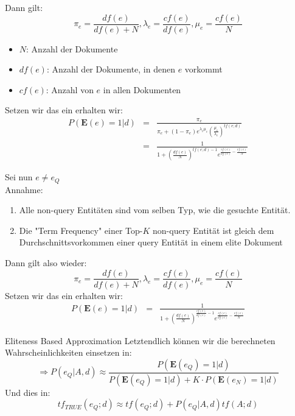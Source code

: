 \documentclass{beamer}
\begin{document}
\begin{frame}
Dann gilt:
\[ \pi_e = \frac{df(e)}{df(e)+N}, \lambda_e = \frac{cf(e)}{df(e)}, \mu_e = \frac{cf(e)}{N}\]
\begin{itemize}
	\item $N$: Anzahl der Dokumente
	\item $df(e)$: Anzahl der Dokumente, in denen $e$ vorkommt
	\item $cf(e)$: Anzahl von $e$ in allen Dokumenten
\end{itemize}
Setzen wir das ein erhalten wir:
\begin{eqnarray*}
P(\textbf{E}(e) = 1|d) &=& \frac{\pi_e}{\pi_e + (1-\pi_e)e^{\lambda_e  \mu_e}\left( \frac{\mu_e}{\lambda_e}\right)^{tf(e;d)}}\\
	&=& \frac{1}{1+ \left( \frac{df(e)}{N}\right)^{tf(e;d)-1}e^{\frac{cf(e)}{df(e)}-\frac{cf(e)}{N}}}
\end{eqnarray*}

\end{frame}

\begin{frame}
Sei nun $e \neq e_Q$\\
Annahme:
\begin{enumerate} 
\item Alle non-query Entitäten sind vom selben Typ, wie die gesuchte Entität.
\item Die "Term Frequency" einer Top-$K$ non-query Entität ist gleich dem Durchschnittsvorkommen einer query Entität in einem elite Dokument
\end{enumerate}
Dann gilt also wieder:
\[ \pi_e = \frac{df(e)}{df(e)+N}, \lambda_e = \frac{cf(e)}{df(e)}, \mu_e = \frac{cf(e)}{N}\]
Setzen wir das ein erhalten wir:
\begin{eqnarray*}
P(\textbf{E}(e) = 1|d) &=&  \frac{1}{1+ \left( \frac{df(e)}{N}\right)^{\frac{cf(e)}{df(e)}-1}e^{\frac{cf(e)}{df(e)}-\frac{cf(e)}{N}}}
\end{eqnarray*}

\end{frame}

\begin{frame}{Eliteness Based Approximation}
Letztendlich können wir die berechneten Wahrscheinlichkeiten einsetzen in:
\[ \Rightarrow P(e_Q|A,d) \approx \frac{P(\textbf{E}(e_Q)=1|d)}{P(\textbf{E}(e_Q)=1|d) + K \cdot P(\textbf{E}(e_N)=1|d)} \]
Und dies in:
\[tf_{TRUE}(e_Q ; d) \approx tf(e_Q;d) + P(e_Q|A,d)tf(A;d)\]

\end{frame}
\end{document}
